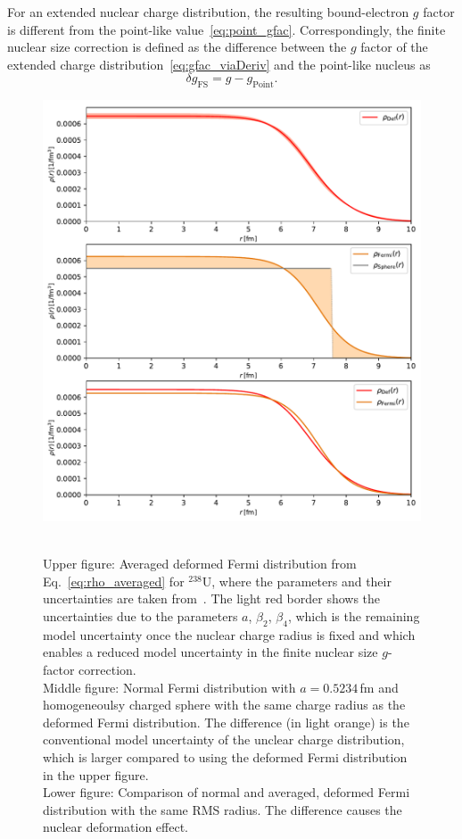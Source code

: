 For an extended nuclear charge distribution, the resulting bound-electron $g$ factor is different from the point-like value~\eqref{eq:point_gfac}. Correspondingly, the finite nuclear size correction is defined as the difference between the $g$ factor of the extended charge distribution~\eqref{eq:gfac_viaDeriv} and the point-like nucleus as
\begin{equation}
\delta g_{\text{FS}}=g-g_{\text{Point}}.
\end{equation}
%
\begin{figure}
\centering
\includegraphics[width=\textwidth]{pics/chargeDistr.pdf}\\
\caption{\label{fig:charge distr.}\\
Upper figure: Averaged deformed Fermi distribution from Eq.~\ref{eq:rho_averaged} for $^{238}$U, where the parameters and their uncertainties are taken from~\cite{kozhedub2008}. The light red border shows the uncertainties due to the parameters $a$, $\beta_2$, $\beta_4$, which is the remaining model uncertainty once the nuclear charge radius is fixed and which enables a reduced model uncertainty in the finite nuclear size $g$-factor correction.\\
Middle figure: Normal Fermi distribution with $a=0.5234\,$fm and homogeneoulsy charged sphere with the same charge radius as the deformed Fermi distribution. The difference (in light orange) is the conventional model uncertainty of the unclear charge distribution, which is larger compared to using the deformed Fermi distribution in the upper figure.\\
Lower figure: Comparison of normal and averaged, deformed Fermi distribution with the same RMS radius. The difference causes the nuclear deformation effect.}
\end{figure}
%
